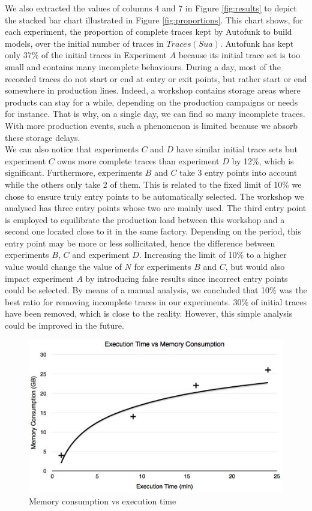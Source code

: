 We also extracted the values of columns 4 and 7 in Figure
\ref{fig:results} to depict the stacked bar chart illustrated in
Figure \ref{fig:proportions}. This chart shows, for each experiment, the
proportion of complete traces kept by Autofunk to build
models, over the initial number of traces in $Traces(Sua)$.
Autofunk has kept only 37\% of the initial traces in
Experiment $A$ because its initial trace set is too small and
contains many incomplete behaviours. During a day, most of the
recorded traces do not start or end at entry or exit points, but
rather start or end somewhere in production lines. Indeed,
a workshop contains storage areas where products can stay
for a while, depending on the production campaigns or needs for
instance. That is why, on a single day, we can find so many
incomplete traces. With more production events, such a phenomenon
is limited because we absorb these storage delays.\\
We can also notice that experiments $C$ and $D$ have similar
initial trace sets but experiment $C$ owns more complete traces
than experiment $D$ by 12\%, which is significant. Furthermore, experiments
$B$ and $C$ take 3 entry points into account while the others only
take 2 of them. This is related to the fixed limit of 10\% we
chose to ensure truly entry points to be automatically selected.
The workshop we analysed has three entry points whose two are
mainly used. The third entry point is employed to equilibrate the
production load between this workshop and a second one located
close to it in the same factory. Depending on the period, this
entry point may be more or less sollicitated, hence the
difference between experiments $B$, $C$ and experiment $D$.
Increasing the limit of 10\% to a higher value would change the value
of $N$ for experiments $B$ and $C$, but would also impact
experiment $A$ by introducing false results since incorrect entry
points could be selected. By means of a manual analysis, we
concluded that 10\% was the best ratio for removing incomplete
traces in our experiments. 30\% of initial traces have been
removed, which is close to the reality. However, this simple
analysis could be improved in the future.

\begin{figure}[ht]
  \includegraphics[width=0.8\linewidth]{figures/memory-time.png}

  \caption{Memory consumption vs execution time}
  \label{fig:memory-time}
\end{figure}

